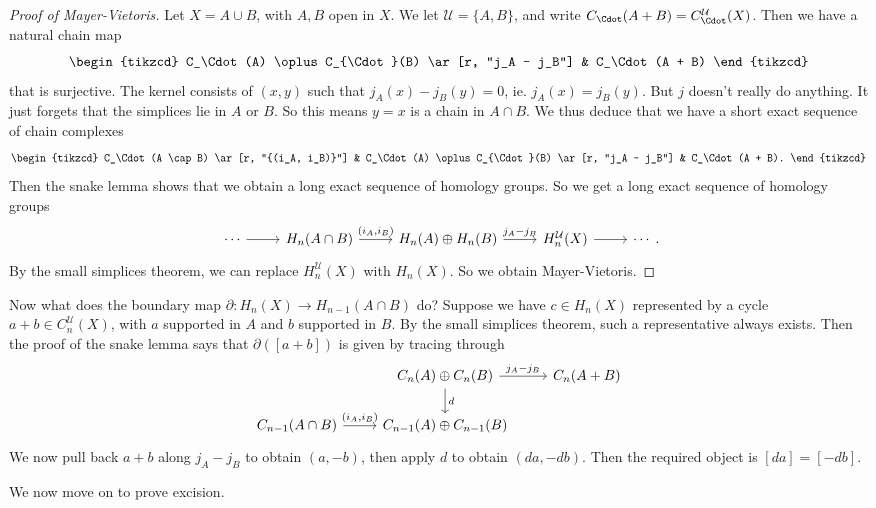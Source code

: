 \documentclass[a4paper]{article}
\theoremstyle{definition}
\begin{document}
\begin{proof}[Proof of Mayer-Vietoris]
  Let $X = A \cup B$, with $A, B$ open in $X$. We let $\mathcal{U} = \{A, B\}$, and write $C_\Cdot(A + B) = C_\Cdot^\mathcal{U} (X)$. Then we have a natural chain map
  \[
    \begin{tikzcd}
      C_\Cdot(A) \oplus C_{\Cdot}(B) \ar[r, "j_A - j_B"] & C_\Cdot(A + B)
    \end{tikzcd}
  \]
  that is surjective. The kernel consists of $(x, y)$ such that $j_A(x) - j_B(y) = 0$, ie. $j_A(x) = j_B(y)$. But $j$ doesn't really do anything. It just forgets that the simplices lie in $A$ or $B$. So this means $y = x$ is a chain in $A \cap B$. We thus deduce that we have a short exact sequence of chain complexes
  \[
    \begin{tikzcd}
      C_\Cdot(A \cap B) \ar[r, "{(i_A, i_B)}"] & C_\Cdot(A) \oplus C_{\Cdot}(B) \ar[r, "j_A - j_B"] & C_\Cdot(A + B).
    \end{tikzcd}
  \]
  Then the snake lemma shows that we obtain a long exact sequence of homology groups. So we get a long exact sequence of homology groups
  \[
    \begin{tikzcd}
      \cdots\ar[r] & H_n(A \cap B) \ar[r, "{(i_A, i_B)}"] & H_n(A) \oplus H_n(B) \ar[r, "j_A - j_B"] & H_n^\mathcal{U}(X) \ar[r] & \cdots
    \end{tikzcd}.
  \]
  By the small simplices theorem, we can replace $H_n^\mathcal{U}(X)$ with $H_n(X)$. So we obtain Mayer-Vietoris.
\end{proof}

Now what does the boundary map $\partial: H_n(X) \to H_{n - 1}(A \cap B)$ do? Suppose we have $c \in H_n(X)$ represented by a cycle $a + b \in C_n^\mathcal{U}(X)$, with $a$ supported in $A$ and $b$ supported in $B$. By the small simplices theorem, such a representative always exists. Then the proof of the snake lemma says that $\partial([a + b])$ is given by tracing through
\[
  \begin{tikzcd}
    & C_n(A) \oplus C_n(B) \ar[r, "j_A - j_B"] \ar[d, "d"] & C_n(A + B)\\
    C_{n - 1}(A \cap B) \ar[r, "{(i_A, i_B)}"] & C_{n - 1}(A) \oplus C_{n - 1}(B)
  \end{tikzcd}
\]
We now pull back $a + b$ along $j_A - j_B$ to obtain $(a, -b)$, then apply $d$ to obtain $(da, -db)$. Then the required object is $[da] = [-db]$.

We now move on to prove excision.
\end{document}
